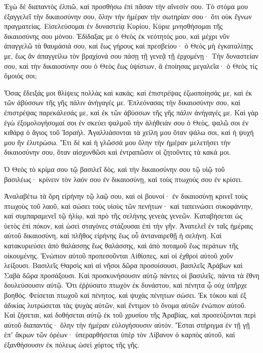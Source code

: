 \begin{spacing}{1.1}
\begin{multicols}{2}
Ἐγὼ δὲ διαπαντὸς ἐλπιῶ, καὶ προσθήσω ἐπὶ πᾶσαν τὴν αἴνεσίν σου.
Τὸ στόμα μου ἐξαγγελεῖ τὴν δικαιοσύνην σου, ὅλην τὴν ἡμέραν τὴν σωτηρίαν σου· ὅτι οὐκ ἔγνων πραγματείας.
Εἰσελεύσομαι ἐν δυναστείᾳ Κυρίου, Κύριε μνησθήσομαι τῆς δικαιοσύνης σου μόνου.
Ἐδίδαξας με ὁ Θεὸς ἐκ νεότητός μου, καὶ μέχρι νῦν ἀπαγγελῶ τὰ θαυμάσιά σου,
καὶ ἕως γήρους καὶ πρεσβείου· ὁ Θεὸς μὴ ἐγκαταλίπῃς με, ἕως ἂν ἀπαγγείλω τὸν βραχίονά σου πάσῃ τῇ γενεᾷ τῇ ἐρχομένῃ· Τὴν δυναστείαν σου,
καὶ τὴν δικαιοσύνην σου ὁ Θεὸς ἕως ὑψίστων, ἃ ἐποίησας μεγαλεῖα· ὁ Θεὸς τίς ὅμοιός σοι;

Ὅσας ἔδειξάς μοι θλίψεις πολλὰς καὶ κακάς; καὶ ἐπιστρέψας ἐζωοποίησάς με, καὶ ἐκ τῶν ἀβύσσων τῆς γῆς πάλιν ἀνήγαγές με.
Ἐπλεόνασας τὴν δικαιοσύνην σου, καὶ ἐπιστρέψας παρεκάλεσάς με, καὶ ἐκ τῶν ἀβύσσων τῆς γῆς πάλιν ἀνήγαγές με.
Καὶ γὰρ ἐγὼ ἐξομολογήσομαί σοι ἐν σκεύει ψαλμοῦ τὴν ἀλήθειάν σου ὁ Θεὸς, ψαλῶ σοι ἐν κιθάρᾳ ὁ ἅγιος τοῦ Ἰσραήλ.
Ἀγαλλιάσονται τὰ χείλη μου ὅταν ψάλω σοι, καὶ ἡ ψυχή μου ἣν ἐλυτρώσω.
Ἔτι δὲ καὶ ἡ γλῶσσά μου ὅλην τὴν ἡμέραν μελετήσει τὴν δικαιοσύνην σου, ὅταν αἰσχυνθῶσι καὶ ἐντραπῶσιν οἱ ζητοῦντες τὰ κακά μοι.

Ὁ Θεὸς τὸ κρίμα σου τῷ βασιλεῖ δὸς, καὶ τὴν δικαιοσύνην σου τῷ υἱῷ τοῦ βασιλέως·
κρίνειν τὸν λαόν σου ἐν δικαιοσύνῃ, καὶ τοὺς πτωχούς σου ἐν κρίσει.

Ἀναλαβέτω τὰ ὄρη εἰρήνην τῷ λαῷ σου, καὶ οἱ βουνοί·
ἐν δικαιοσύνῃ κρινεῖ τοὺς πτωχοὺς τοῦ λαοῦ, καὶ σώσει τοὺς υἱοὺς τῶν πενήτων· καὶ ταπεινώσει συκοφάντην,
καὶ συμπαραμενεῖ τῷ ἡλίῳ, καὶ πρὸ τῆς σελήνης γενεὰς γενεῶν.
Καταβήσεται ὡς ὑετὸς ἐπὶ πόκον, καὶ ὡσεὶ σταγόνες στάζουσαι ἐπὶ τὴν γῆν.
Ἀνατελεῖ ἐν ταῖς ἡμέραις αὐτοῦ δικαιοσύνη, καὶ πλῆθος εἰρήνης ἕως οὗ ἀνταναιρεθῇ ἡ σελήνη.
Καὶ κατακυριεύσει ἀπὸ θαλάσσης ἕως θαλάσσης, καὶ ἀπὸ ποταμοῦ ἕως περάτων τῆς οἰκουμένης.
Ἐνώπιον αὐτοῦ προπεσοῦνται Αἰθίοπες, καὶ οἱ ἐχθροὶ αὐτοῦ χοῦν λείξουσι.
Βασιλεῖς Θαρσὶς καὶ αἱ νῆσοι δῶρα προσοίσουσι, βασιλεῖς Ἀράβων καὶ Σαβὰ δῶρα προσάξουσι.
Καὶ προσκυνήσουσιν αὐτῷ πάντες οἱ βασιλεῖς, πάντα τὰ ἔθνη δουλεύσουσιν αὐτῷ.
Ὅτι ἐῤῥύσατο πτωχὸν ἐκ δυνάστου, καὶ πένητα ᾧ οὐχ ὑπῆρχε βοηθός.
Φείσεται πτωχοῦ καὶ πένητος, καὶ ψυχὰς πένητων σώσει.
Ἐκ τόκου καὶ ἐξ ἀδικίας λυτρώσεται τὰς ψυχὰς αὐτῶν, καὶ ἔντιμον τὸ ὄνομα αὐτῶν ἐνώπιον αὐτοῦ.
Καὶ ζήσεται, καὶ δοθήσεται αὐτῷ ἐκ τοῦ χρυσίου τῆς Ἀραβίας, καὶ προσεύξονται περὶ αὐτοῦ διαπαντός· ὅλην τὴν ἡμέραν εὐλογήσουσιν αὐτόν.
Ἔσται στήριγμα ἐν τῇ γῇ ἐπʼ ἄκρων τῶν ὀρέων· ὑπεραρθήσεται ὑπὲρ τὸν Λίβανον ὁ καρπὸς αὐτοῦ, καὶ ἐξανθήσουσιν ἐκ πόλεως ὡσεὶ χόρτος τῆς γῆς.


\end{multicols}
\end{spacing}
